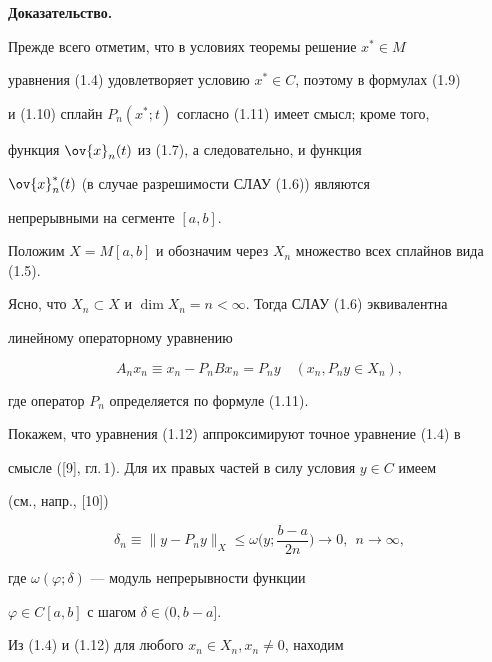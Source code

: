 {\bf Доказательство.}


Прежде всего отметим, что в условиях теоремы решение $x^*\in M$


уравнения (1.4) удовлетворяет условию $x^*\in C$, поэтому в формулах (1.9)


и (1.10) сплайн $P_n(x^*;t)$ согласно (1.11) имеет смысл; кроме того,


функция $\ov{x}_n(t)$ из (1.7), а следовательно, и функция


$\ov{x}_n^*(t)$ (в случае разрешимости СЛАУ (1.6)) являются


непрерывными на сегменте $[a,b]$.





Положим $X=M[a,b]$ и обозначим через $X_n$ множество всех сплайнов вида (1.5).


Ясно, что $X_n\subset X$ и $\dim X_n=n<\infty$. Тогда СЛАУ (1.6) эквивалентна


линейному операторному уравнению


\begin{equation}


A_nx_n\equiv x_n-P_nBx_n=P_ny\quad (x_n,P_ny\in X_n),


\end{equation}


где оператор $P_n$ определяется по формуле (1.11).





Покажем, что уравнения (1.12) аппроксимируют точное уравнение (1.4) в


смысле ([9], гл.\,1). Для их правых частей в силу условия $y\in C$ имеем


(см., напр., [10])


\begin{equation}


\delta_n\equiv \|y-P_ny\|_X\leq


\omega\bigg(y;\frac{b-a}{2n}\bigg)\rightarrow 0,\ \


n\rightarrow \infty ,


\end{equation}


где $\omega(\varphi ;\delta)$ --- модуль непрерывности функции


$\varphi\in C[a,b]$ с шагом $\delta\in (0,b-a]$.





Из (1.4) и (1.12) для любого $x_n\in X_n, x_n\ne 0$, находим


